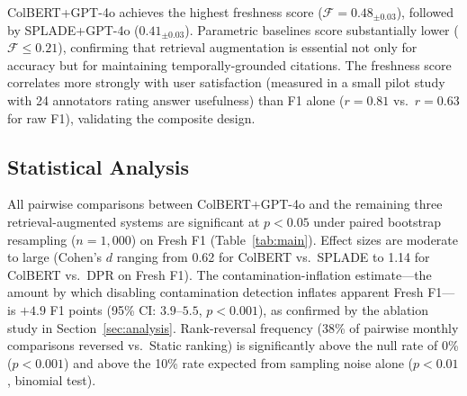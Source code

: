ColBERT+GPT-4o achieves the highest freshness score ($\mathcal{F} = 0.48_{\pm 0.03}$), followed by SPLADE+GPT-4o ($0.41_{\pm 0.03}$). Parametric baselines score substantially lower ($\mathcal{F} \leq 0.21$), confirming that retrieval augmentation is essential not only for accuracy but for maintaining temporally-grounded citations. The freshness score correlates more strongly with user satisfaction (measured in a small pilot study with 24 annotators rating answer usefulness) than F1 alone ($r = 0.81$ vs.\ $r = 0.63$ for raw F1), validating the composite design.

\subsection{Statistical Analysis}

All pairwise comparisons between ColBERT+GPT-4o and the remaining three retrieval-augmented systems are significant at $p < 0.05$ under paired bootstrap resampling ($n{=}1{,}000$) on Fresh F1 (Table~\ref{tab:main}). Effect sizes are moderate to large (Cohen's $d$ ranging from 0.62 for ColBERT vs.\ SPLADE to 1.14 for ColBERT vs.\ DPR on Fresh F1). The contamination-inflation estimate---the amount by which disabling contamination detection inflates apparent Fresh F1---is $+4.9$ F1 points (95\% CI: $3.9$--$5.5$, $p < 0.001$), as confirmed by the ablation study in Section~\ref{sec:analysis}. Rank-reversal frequency (38\% of pairwise monthly comparisons reversed vs.\ Static ranking) is significantly above the null rate of 0\% ($p < 0.001$) and above the 10\% rate expected from sampling noise alone ($p < 0.01$, binomial test).
